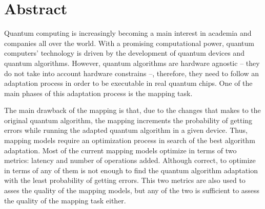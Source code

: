 \chapter*{Abstract}



Quantum computing is increasingly becoming a main interest in academia and companies all over the world.
With a promising computational power, quantum computers' technology is driven by the development of quantum devices and quantum algorithms.
However, quantum algorithms are hardware agnostic -- they do not take into account hardware constrains --, therefore, they need to follow an adaptation process in order to be executable in real quantum chips.
One of the main phases of this adaptation process is the mapping task.

The main drawback of the mapping is that, due to the changes that makes to the original quantum algorithm, the mapping increments the probability of getting errors while running the adapted quantum algorithm in a given device.
Thus, mapping models require an optimization process in search of the best algorithm adaptation.
Most of the current mapping models optimize in terms of two metrics: latency and number of operations added.
Although correct, to optimize in terms of any of them is not enough to find the quantum algorithm adaptation with the least probability of getting errors.
This two metrics are also used to asses the quality of the mapping models, but any of the two is sufficient to assess the quality of the mapping task either.

